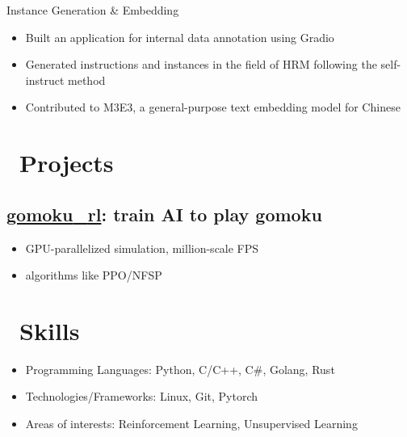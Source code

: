 \documentclass{resume}
\begin{document}
Instance Generation \& Embedding
\begin{itemize}
  \item Built an application for internal data annotation using Gradio
  \item Generated instructions and instances in the field of HRM following the self-instruct method
  \item Contributed to M3E3, a general-purpose text embedding model for Chinese
\end{itemize}

\section{\faRocket\ Projects}

\subsection{\textbf{\href{https://github.com/hesic73/gomoku_rl}{gomoku{\_}rl}}: train AI to play gomoku}

\begin{itemize}
  \item GPU-parallelized simulation, million-scale FPS
  \item algorithms like PPO/NFSP
\end{itemize}


\section{\faCogs\ Skills}
\begin{itemize}[parsep=0.5ex]
  \item Programming Languages: Python, C/C++, C\#, Golang, Rust
  \item Technologies/Frameworks: Linux, Git, Pytorch
  \item Areas of interests: Reinforcement Learning, Unsupervised Learning
\end{itemize}



%
%
\end{document}

